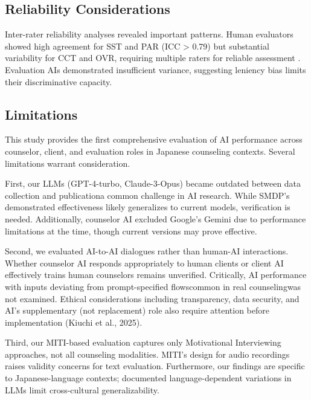 \documentclass{wiley-article}
\begin{document}
\subsection*{Reliability Considerations}

Inter-rater reliability analyses revealed important patterns. Human evaluators showed high agreement for SST and PAR (ICC > 0.79) but substantial variability for CCT and OVR, requiring multiple raters for reliable assessment \citep{kooGuidelineSelectingReporting2016}. Evaluation AIs demonstrated insufficient variance, suggesting leniency bias limits their discriminative capacity.


\subsection*{Limitations}

This study provides the first comprehensive evaluation of AI performance across counselor, client, and evaluation roles in Japanese counseling contexts. Several limitations warrant consideration.

First, our LLMs (GPT-4-turbo, Claude-3-Opus) became outdated between data collection and publication\textemdash{}a common challenge in AI research. While SMDP's demonstrated effectiveness likely generalizes to current models, verification is needed. Additionally, counselor AI excluded Google's Gemini due to performance limitations at the time, though current versions may prove effective.

Second, we evaluated AI-to-AI dialogues rather than human-AI interactions. Whether counselor AI responds appropriately to human clients or client AI effectively trains human counselors remains unverified. Critically, AI performance with inputs deviating from prompt-specified flows\textemdash{}common in real counseling\textemdash{}was not examined. Ethical considerations including transparency, data security, and AI's supplementary (not replacement) role also require attention before implementation (Kiuchi et al., 2025).

Third, our MITI-based evaluation captures only Motivational Interviewing approaches, not all counseling modalities. MITI's design for audio recordings raises validity concerns for text evaluation. Furthermore, our findings are specific to Japanese-language contexts; documented language-dependent variations in LLMs limit cross-cultural generalizability.


\end{document}
